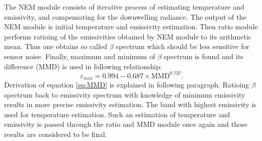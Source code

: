 The NEM module consists of iterative process of estimating temperature and emissivity, and compensating for the downwelling radiance. The output of the NEM module is initial temperature and emissivity estimation. Then ratio module performs ratioing of the emissivities obtained by NEM module to its arithmetic mean. Thus one obtains so called $\beta$ spectrum which should be less sensitive for sensor noise. Finally, maximum and minimum of $\beta$ spectrum is found and its difference (MMD) is used in following relationship:
\begin{equation} \varepsilon_{min} = 0.994 - 0.687 \times \text{MMD}^{0.737}. \label{eq:MMD} \end{equation}
Derivation of equation \ref{eq:MMD} is explained in following paragraph. Ratioing $\beta$ spectrum back to emissivity spectrum with knowledge of minimum emissivity results in more precise emissivity estimation. The band with highest emissivity is used for temperature estimation. Such an estimation of temperature and emissivity is passed through the ratio and MMD module once again and those results are considered to be final.

